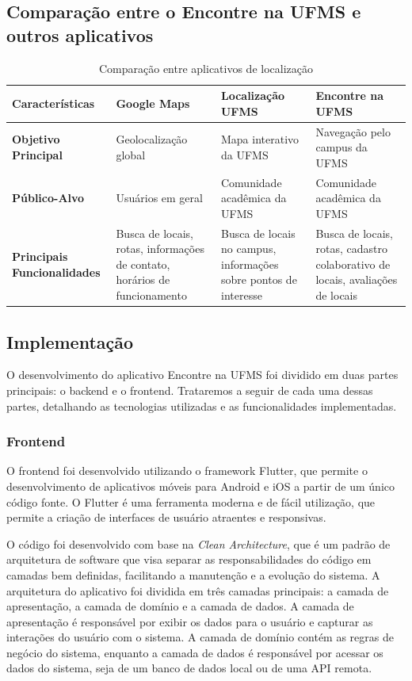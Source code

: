 \subsection{Comparação entre o Encontre na UFMS e outros aplicativos}
\begin{table}[h]
    \begin{tabularx}{\textwidth}{|X|X|X|X|}
        \hline
        \textbf{Características} & \textbf{Google Maps} & \textbf{Localização UFMS} & \textbf{Encontre na UFMS} \\ \hline
        \textbf{Objetivo Principal} & Geolocalização global & Mapa interativo da UFMS & Navegação pelo campus da UFMS \\ \hline
        \textbf{Público-Alvo} & Usuários em geral & Comunidade acadêmica da UFMS & Comunidade acadêmica da UFMS \\ \hline
        \textbf{Principais Funcionalidades} & Busca de locais, rotas, informações de contato, horários de funcionamento & Busca de locais no campus, informações sobre pontos de interesse & Busca de locais, rotas, cadastro colaborativo de locais, avaliações de locais \\ \hline
    \end{tabularx}
    \caption{Comparação entre aplicativos de localização}
    \footnotesize  {}
    \label{tab:comparacao-aplicativos}
\end{table}

\subsection{Implementação}

    O desenvolvimento do aplicativo Encontre na UFMS foi dividido em duas partes principais: o backend e o frontend. Trataremos a seguir de cada uma dessas partes, detalhando as tecnologias utilizadas e as funcionalidades implementadas.

\subsubsection{Frontend}

    O frontend foi desenvolvido utilizando o framework Flutter, que permite o desenvolvimento de aplicativos móveis para Android e iOS a partir de um único código fonte. O Flutter é uma ferramenta moderna e de fácil utilização, que permite a criação de interfaces de usuário atraentes e responsivas.

    O código foi desenvolvido com base na \textit{Clean Architecture}, que é um padrão de arquitetura de software que visa separar as responsabilidades do código em camadas bem definidas, facilitando a manutenção e a evolução do sistema. A arquitetura do aplicativo foi dividida em três camadas principais: a camada de apresentação, a camada de domínio e a camada de dados. A camada de apresentação é responsável por exibir os dados para o usuário e capturar as interações do usuário com o sistema. A camada de domínio contém as regras de negócio do sistema, enquanto a camada de dados é responsável por acessar os dados do sistema, seja de um banco de dados local ou de uma API remota.


